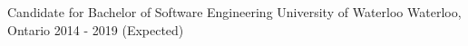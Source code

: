 


\begin{cventries}


\cventry
{Candidate for Bachelor of Software Engineering} %
{University of Waterloo}
{Waterloo, Ontario} %
    {2014 - 2019 (Expected)} %
{ %
}


\end{cventries}
